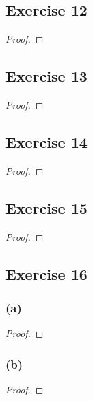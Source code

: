\documentclass[14pt]{extarticle}
\begin{document}
\subsection{Exercise 12}

\begin{proof}

\end{proof}

\subsection{Exercise 13}

\begin{proof}

\end{proof}

\subsection{Exercise 14}

\begin{proof}

\end{proof}

\subsection{Exercise 15}

\begin{proof}

\end{proof}

\subsection{Exercise 16}

\subsubsection{(a)}

\begin{proof}

\end{proof}

\subsubsection{(b)}

\begin{proof}

\end{proof}
\end{document}
